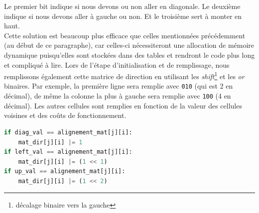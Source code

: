 \documentclass[12pt]{article}
\begin{document}
Le premier bit indique si nous devons ou non aller en diagonale. Le deuxième indique si nous devons aller à gauche ou non. Et le troisième sert à monter en haut. \\
Cette solution est beaucoup plus efficace que celles mentionnées précédemment (au début de ce paragraphe), car celles-ci nécessiteront une allocation de mémoire dynamique puisqu'elles sont stockées dans des tables et rendront le code plus long et compliqué à lire. 
Lors de l'étape d'initialisation et de remplissage, nous remplissons également cette matrice de direction en utilisant les \textsl{shift}\footnote{décalage binaire vers la gauche} et les \textsl{or} binaires. Par exemple, la première ligne sera remplie avec \texttt{010} (qui est 2 en décimal), de même la colonne la plus à gauche sera remplie avec \texttt{100} (4 en décimal). Les autres cellules sont remplies en fonction de la valeur des cellules voisines et des coûts de fonctionnement. 


\begin{lstlisting}[caption={
Définition des bits de direction des cellules 'intérieures' de la matrice. Ce morceau de code est inséré à l'intérieur d'une boucle \texttt{for}  imbriqué similaire à celle mentionnée dans la section précédente}, language=Python]
if diag_val == alignement_mat[j][i]:
    mat_dir[j][i] |= 1
if left_val == alignement_mat[j][i]:
    mat_dir[j][i] |= (1 << 1)
if up_val == alignement_mat[j][i]:
    mat_dir[j][i] |= (1 << 2)
\end{lstlisting}
\end{document}
